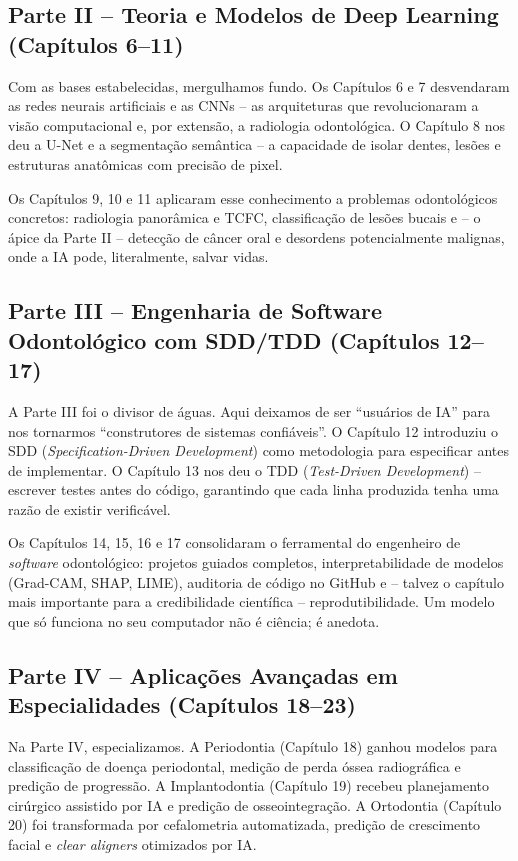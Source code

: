 \subsection{Parte II -- Teoria e Modelos de Deep Learning (Capítulos 6--11)}

Com as bases estabelecidas, mergulhamos fundo. Os Capítulos 6 e 7 desvendaram
as redes neurais artificiais e as CNNs -- as arquiteturas que revolucionaram a
visão computacional e, por extensão, a radiologia odontológica. O Capítulo 8
nos deu a U-Net e a segmentação semântica -- a capacidade de isolar dentes,
lesões e estruturas anatômicas com precisão de pixel.

Os Capítulos 9, 10 e 11 aplicaram esse conhecimento a problemas odontológicos
concretos: radiologia panorâmica e TCFC, classificação de lesões bucais e --
o ápice da Parte II -- detecção de câncer oral e desordens potencialmente
malignas, onde a IA pode, literalmente, salvar vidas.

\subsection{Parte III -- Engenharia de Software Odontológico com SDD/TDD (Capítulos 12--17)}

A Parte III foi o divisor de águas. Aqui deixamos de ser ``usuários de IA''
para nos tornarmos ``construtores de sistemas confiáveis''. O Capítulo 12
introduziu o SDD (\textit{Specification-Driven Development}) como metodologia
para especificar antes de implementar. O Capítulo 13 nos deu o TDD
(\textit{Test-Driven Development}) -- escrever testes antes do código, garantindo
que cada linha produzida tenha uma razão de existir verificável.

Os Capítulos 14, 15, 16 e 17 consolidaram o ferramental do engenheiro de
\textit{software} odontológico: projetos guiados completos, interpretabilidade
de modelos (Grad-CAM, SHAP, LIME), auditoria de código no GitHub e -- talvez o
capítulo mais importante para a credibilidade científica -- reprodutibilidade.
Um modelo que só funciona no seu computador não é ciência; é anedota.

\subsection{Parte IV -- Aplicações Avançadas em Especialidades (Capítulos 18--23)}

Na Parte IV, especializamos. A Periodontia (Capítulo 18) ganhou modelos para
classificação de doença periodontal, medição de perda óssea radiográfica e
predição de progressão. A Implantodontia (Capítulo 19) recebeu planejamento
cirúrgico assistido por IA e predição de osseointegração. A Ortodontia
(Capítulo 20) foi transformada por cefalometria automatizada, predição de
crescimento facial e \textit{clear aligners} otimizados por IA.

